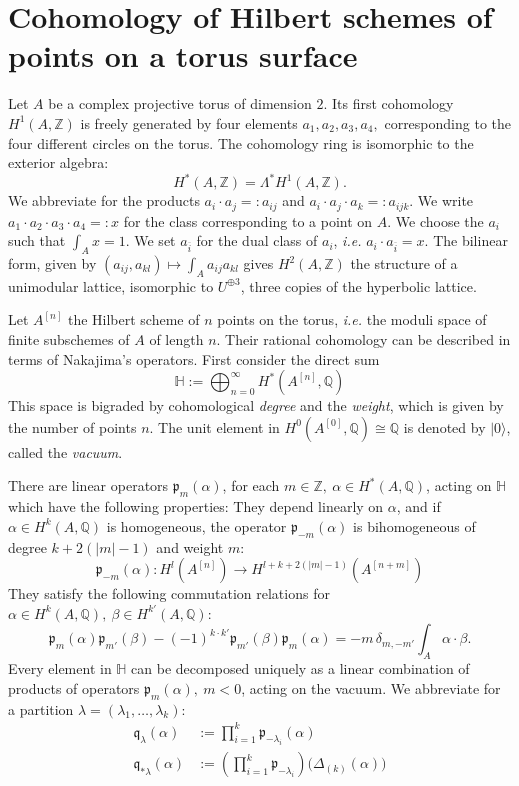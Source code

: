 \documentclass{amsart}
\newcommand{\hilb}[1]{^{[#1]}}
\newcommand{\ie}{{\it i.e. }}
\newcommand{\vac}{|0\rangle}
\newcommand{\p}{\mathfrak{p}}
\renewcommand{\H}{\mathbb{H}}
\newcommand{\Q}{\mathbb{Q}}
\newcommand{\Z}{\mathbb{Z}}
\newcommand{\kq}{\mathfrak{q}}
\theoremstyle{plain}
\theoremstyle{definition}
\theoremstyle{remark}
\begin{document}
\section{Cohomology of Hilbert schemes of points on a torus surface}
Let $A$ be a complex projective torus of dimension $2$. Its first cohomology $H^1(A,\Z)$ is freely generated by four elements $a_1,a_2,a_3,a_4,$ corresponding to the four different circles on the torus. The cohomology ring is isomorphic to the exterior algebra:
$$
H^*(A,\Z) = \Lambda^* H^1(A,\Z).
$$
We abbreviate for the products $a_i\cdot a_j =: a_{ij}$ and $a_i\cdot a_j\cdot a_k =: a_{ijk}$. We write $a_1\cdot a_2\cdot a_3 \cdot a_4 =:x$ for the class corresponding to a point on $A$. We choose the $a_i$ such that $\int_A x = 1$. We set $a_{\overline{i}}$ for the dual class of $a_i$, \ie  $a_i\cdot a_{\overline{i}} =x$.
The bilinear form, given by $(a_{ij},a_{kl})\mapsto\int_A a_{ij}a_{kl}$ gives $H^2(A,\Z)$ the structure of a unimodular lattice, isomorphic to $U^{\oplus 3}$, three copies of the hyperbolic lattice. 

Let $A\hilb{n}$ the Hilbert scheme of $n$ points on the torus, \ie the moduli space of finite subschemes of $A$ of length $n$. Their rational cohomology can be described in terms of Nakajima's operators. First consider the direct sum
$$
\H := \bigoplus_{n=0}^{\infty} H^*(A\hilb{n},\Q)
$$
This space is bigraded by cohomological \emph{degree} and the \emph{weight}, which is given by the number of points $n$. The unit element in $H^0(A\hilb{0},\Q) \cong \Q$ is denoted by $\vac$, called the \emph{vacuum}.

There are linear operators $\p_m(\alpha)$, for each $m\in \Z,\ \alpha \in H^*(A,\Q)$, acting on $\H$ which have the following properties: They depend linearly on $\alpha$, and if $\alpha\in H^k(A,\Q)$ is homogeneous, the operator $\p_{-m}(\alpha)$ is bihomogeneous of degree $k+2(|m|-1)$ and weight $m$:
$$
\p_{-m}(\alpha) : H^l(A\hilb{n}) \rightarrow H^{l+k+2(|m|-1)}(A\hilb{n+m})
$$
They satisfy the following commutation relations for $\alpha\in H^k(A,\Q),\ \beta\in H^{k'}(A,\Q)$:
$$
\p_{m}(\alpha)\p_{m'}(\beta) - (-1)^{k\cdot k'}\p_{m'}(\beta)\p_{m}(\alpha) = -m\,\delta_{m,-m'} \int_A \alpha\cdot\beta.
$$
Every element in $\H$ can be decomposed uniquely as a linear combination of products of operators $\p_{m}(\alpha),\ m<0$, acting on the vacuum. 
We abbreviate for a partition $\lambda=(\lambda_1,\ldots ,\lambda_k)$: \begin{align}
\kq_\lambda(\alpha) & := \prod_{i=1}^k \p_{-\lambda_i}(\alpha) \\
\kq_{*\lambda}(\alpha) & := \left(\prod_{i=1}^k \p_{-\lambda_i}\right)\Big(\Delta_{(k)}(\alpha)\Big)
\end{align}
\end{document}
